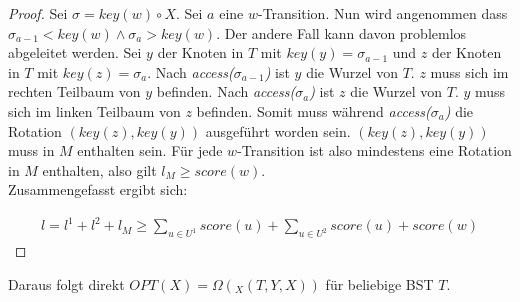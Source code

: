\documentclass[a4paper,12pt]{article}
\begin{document}
\begin{proof}
	Sei $\sigma = \mathit{key}(w) \circ X$. Sei $a$ eine $w$-Transition. Nun wird angenommen dass $\sigma_{a-1} < \mathit{key}(w)  \land \sigma_{a} > \mathit{key}(w)$. Der andere Fall kann davon problemlos abgeleitet werden. Sei $y$ der Knoten in $T$ mit $\mathit{key}(y) = \sigma_{a-1}$ und $z$ der Knoten in $T$ mit $\mathit{key}(z) = \sigma_{a}$. Nach \textit{access($\sigma_{a-1}$)} ist $y$ die Wurzel von $T$. $z$ muss sich im rechten Teilbaum von $y$ befinden. Nach  \textit{access($\sigma_{a}$)} ist $z$ die Wurzel von $T$. $y$ muss sich im linken Teilbaum von $z$ befinden. Somit muss während \textit{access($\sigma_{a}$)} die Rotation $(\mathit{key}(z),\mathit{key}(y))$ ausgeführt worden sein. $(\mathit{key}(z),\mathit{key}(y))$ muss in $M$ enthalten sein. Für jede $w$-Transition ist also mindestens eine Rotation in $M$ enthalten, also gilt $l_M \geq  \mathit{score} \left(w\right)$.\\
	Zusammengefasst ergibt sich:
	
	\begin{align*}
	l = l^1 + l^2 + l_M \geq \sum_{u \in U^1} {\mathit{score}} (u) + \sum_{u \in U^2}{\mathit{score}} (u) +  {\mathit{score}} (w)
	\end{align*}
	
	
	
	
\end{proof}

\noindent Daraus folgt direkt  $\mathit{OPT}\left(X\right) =  \Omega \left({_X(T, Y, X)}\right) $ für beliebige BST $T$.  
\end{document}

